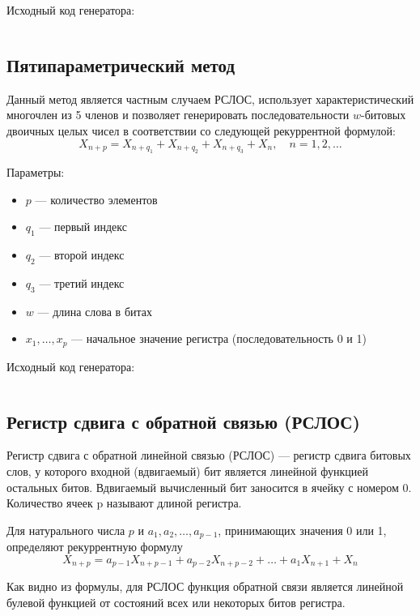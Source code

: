 \documentclass[spec, och, pract_otchet]{SCWorks}
\begin{document}
Исходный код генератора:
\inputminted{rust}{../prng/src/additive.rs}

\subsection{Пятипараметрический метод}

Данный метод является частным случаем РСЛОС, использует характеристический
многочлен из 5 членов и позволяет генерировать последовательности $w$-битовых
двоичных целых чисел в соответствии со следующей рекуррентной формулой:
\begin{equation*}
  X_{n + p} = X_{n + q_1} + X_{n + q_2} + X_{n + q_3} + X_n,\quad n = 1, 2, \dots
\end{equation*}

Параметры:
\begin{itemize}
  \item $p$ --- количество элементов
  \item $q_1$ --- первый индекс
  \item $q_2$ --- второй индекс
  \item $q_3$ --- третий индекс
  \item $w$ --- длина слова в битах
  \item $x_1,\dots,x_p$ --- начальное значение регистра (последовательность 0 и 1)
\end{itemize}

Исходный код генератора:
\inputminted{rust}{../prng/src/fp.rs}

\subsection{Регистр сдвига с обратной связью (РСЛОС)}

Регистр сдвига с обратной линейной связью (РСЛОС) --- регистр сдвига битовых
слов, у которого входной (вдвигаемый) бит является линейной функцией остальных
битов. Вдвигаемый вычисленный бит заносится в ячейку с номером 0. Количество
ячеек p называют длиной регистра.

Для натурального числа $p$ и $a_1, a_2, \dots, a_{p - 1}$, принимающих значения
0 или 1, определяют рекуррентную формулу
\begin{equation}
  X_{n + p} = a_{p - 1} X_{n + p - 1} + a_{p - 2} X_{n + p - 2} + \dots +
  a_1 X_{n + 1} + X_n
  \label{eq:lfsr}
\end{equation}

Как видно из формулы, для РСЛОС функция обратной связи является линейной булевой
функцией от состояний всех или некоторых битов регистра.
\end{document}
